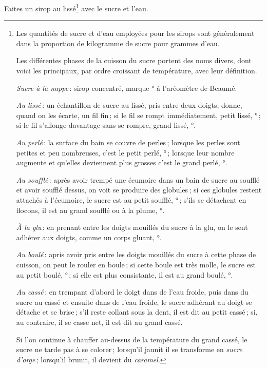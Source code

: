 Faites un sirop au lissé\footnote{Les quantités de sucre et d'eau employées
pour les sirops sont généralement dans la proportion de {\mmm} kilogramme
de sucre pour {\mmm} grammes d'eau. \protect

Les différentes phases de la cuisson du sucre portent des noms divers, dont
voici les principaux, par ordre croissant de température, avec leur définition.
\protect

\textit{Sucre à la nappe} : sirop concentré, marque {\mmm}° à l'aréomètre
de Beaumé.
\protect

\textit{Au lissé} : un échantillon de sucre au lissé, pris entre deux doigts,
donne, quand on les écarte, un fil fin ; si le fil se rompt immédiatement,
petit lissé, {\mmm}° ; si le fil s'allonge davantage sans se rompre,
grand lissé, {\mmm}°.
\protect

\textit{Au perlé} : la surface du bain se couvre de perles ; lorsque les perles
sont petites et peu nombreuses, c'est le petit perlé, {\mmm}° ; lorsque leur
nombre augmente et qu'elles deviennent plus grosses c'est le grand perlé,
{\mmm}°.
\protect

\textit{Au soufflé} : après avoir trempé une écumoire dans un bain de sucre au
soufflé et avoir soufflé dessus, on voit se produire des globules ; si ces
globules restent attachés à l'écumoire, le sucre est au petit soufflé,
{\mmm}° ; s'ils se détachent en flocons, il est au grand soufflé ou à la
plume, {\mmm}°.
\protect

\textit{À la glu} : en prenant entre les doigts mouillés du sucre à la glu, on
le sent adhérer aux doigts, comme un corps gluant, {\mmm}°.
\protect

\textit{Au boulé} : apris avoir pris entre les doigts mouillés du sucre à cette
phase de cuisson, on peut le rouler en boule ; si cette boule est très molle,
le sucre est au petit boulé, {\mmm}° ; si elle est plus consistante, il
est au grand boulé, {\mmm}°.
\protect

\label{pg0898} \hypertarget{p0898}{}
\textit{Au cassé} : en trempant d'abord le doigt dans de l'eau froide, puis
dans du sucre au cassé et ensuite dans de l'eau froide, le sucre adhérant au
doigt se détache et se brise ; s’il reste collant sous la dent, il est dit au
petit cassé ; si, au contraire, il se casse net, il est dit au grand cassé.
\protect

Si l'on continue à chauffer au-dessus de la température du grand cassé, le
sucre ne tarde pas à se colorer ; lorsqu'il jaunit il se transforme en
\textit{sucre d'orge} ; lorsqu'il brunit, il devient du \textit{caramel}.}
avec le sucre et l'eau.

